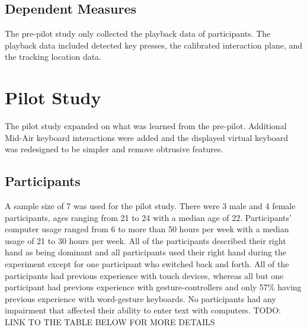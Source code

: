 \begin{table}[h]
	\centering
	\caption[Pre-pilot Study Schedule of Assessments]{\centering Schedule of Assessments for a single study visit (in minutes).}
	\label{pre_schedule_of_assessments}
\end{table}
	
\subsection{Dependent Measures}
The pre-pilot study only collected the playback data of participants. The playback data included detected key presses, the calibrated interaction plane, and the tracking location data.

\section{Pilot Study} \label{pilot}
The pilot study expanded on what was learned from the pre-pilot. Additional Mid-Air keyboard interactions were added and the displayed virtual keyboard was redesigned to be simpler and remove obtrusive features.

\subsection{Participants} \label{pilot_participants}
A sample size of 7 was used for the pilot study. There were 3 male and 4 female participants, ages ranging from 21 to 24 with a median age of 22. Participants' computer usage ranged from 6 to more than 50 hours per week with a median usage of 21 to 30 hours per week. All of the participants described their right hand as being dominant and all participants used their right hand during the experiment except for one participant who switched back and forth. All of the participants had previous experience with touch devices, whereas all but one participant had previous experience with gesture-controllers and only 57\% having previous experience with word-gesture keyboards. No participants had any impairment that affected their ability to enter text with computers. TODO: LINK TO THE TABLE BELOW FOR MORE DETAILS

